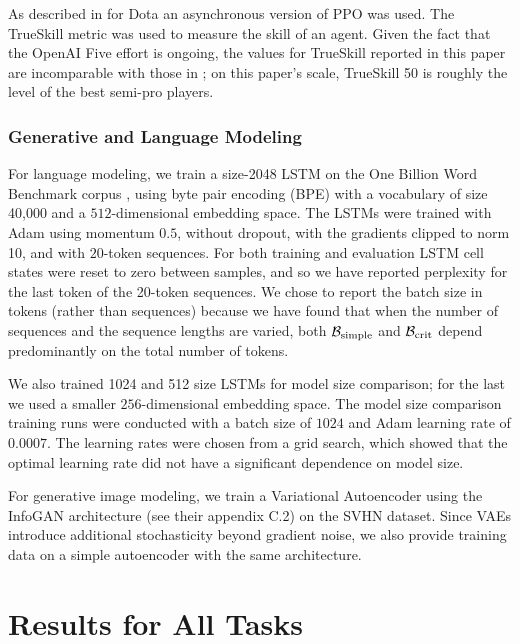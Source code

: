 \documentclass[english]{article}
\newcommand{\CB}{{\cal B}}
\begin{document}
As described in \cite{OpenAI_Five} for Dota an asynchronous version of PPO \cite{DBLP:journals/corr/SchulmanWDRK17} was used. The TrueSkill metric \cite{NIPS2006_3079} was used to measure the skill of an agent. Given the fact that the OpenAI Five effort is ongoing, the values for TrueSkill reported in this paper are incomparable with those in \cite{OpenAI_Five}; on this paper's scale, TrueSkill 50 is roughly the level of the best semi-pro players.

\subsubsection{Generative and Language Modeling}

For language modeling, we train a size-2048 LSTM \cite{Hochreiter:1997:LSM:1246443.1246450} on the One Billion Word Benchmark corpus \cite{1312.3005}, using byte pair encoding (BPE) \cite{DBLP:journals/corr/SennrichHB15} with a vocabulary of size 40,000 and a $512$-dimensional embedding space. The LSTMs were trained with Adam using momentum $0.5$, without dropout, with the gradients clipped to norm 10, and with $20$-token sequences. For both training and evaluation LSTM cell states were reset to zero between samples, and so we have reported perplexity for the last token of the 20-token sequences.   We chose to report the batch size in tokens (rather than sequences) because we have found that when the number of sequences and the sequence lengths are varied, both $\CB_{\rm simple}$ and $\CB_{\rm crit}$ depend predominantly on the total number of tokens.

We also trained 1024 and 512 size LSTMs for model size comparison; for the last we used a smaller $256$-dimensional embedding space.  The model size comparison training runs were conducted with a batch size of $1024$ and Adam learning rate of $0.0007$.  The learning rates were chosen from a grid search, which showed that the optimal learning rate did not have a significant dependence on model size.

For generative image modeling, we train a Variational Autoencoder \cite{1312.6114} using the InfoGAN architecture \cite{1606.03657} (see their appendix C.2) on the SVHN dataset. Since VAEs introduce additional stochasticity beyond gradient noise, we also provide training data on a simple autoencoder with the same architecture.

\section{Results for All Tasks}
\end{document}
